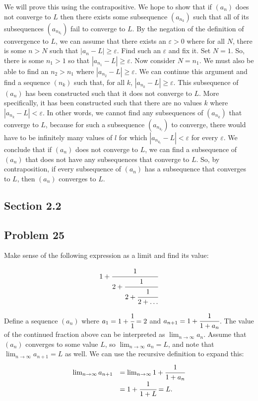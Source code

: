 \documentclass[11pt]{article}
\begin{document}
We will prove this using the contrapositive. We hope to show that if $(a_n)$ does
not converge to $L$ then there exists some subsequence $(a_{n_k})$ such that
all of its subsequences $(a_{n_{k_l}})$ fail to converge to $L$.
By the negation of the definition of convergence to $L$, we can assume that
there exists an $\varepsilon>0$ where for all $N$, there is some $n>N$ such
that $\left|a_n-L\right| \geq \varepsilon$. Find such an $\varepsilon$ and
fix it. Set $N=1$. So, there is some $n_1>1$ so that
$\left|a_{n_1}-L\right|\geq\varepsilon.$ Now consider $N=n_1$. We must also
be able to find an $n_2>n_1$ where $\left|a_{n_2}-L\right|\geq\varepsilon$.
We can continue this argument and find a sequence $(n_k)$ such that,
for all $k$, $\left|a_{n_k}-L\right|\geq\varepsilon$. This subsequence of
$(a_n)$ has been constructed such that it does not converge to $L$. More
specifically, it has been constructed such that there are no values $k$ where
$\left|a_{n_k}-L\right|<\varepsilon$. In other words, we cannot find any
subsequences of $(a_{n_k})$ that converge to $L$, because for such a
subsequence $(a_{n_{k_l}})$ to converge, there would have to be 
infinitely many values of $l$ for which
$\left|a_{n_{k_l}}-L\right|<\varepsilon$ for every $\varepsilon$.
We conclude that if $(a_n)$ does not converge to $L$, we can find a subsequence
of $(a_n)$ that does not have any subsequences that converge to $L$. So, by
contraposition, if every subsequence of $(a_n)$ has a subsequence that
converges to $L$, then $(a_n)$ converges to $L$.

\subsection*{Section 2.2}
\subsection*{Problem 25}
Make sense of the following expression as a limit and find its value:

\[ 1+\cfrac{1}{2+\cfrac{1}{2+\cfrac{1}{2+\ldots}}} \]

Define a sequence $(a_n)$ where $a_1=1+\cfrac{1}{1}=2$ and
$a_{n+1} = 1+\cfrac{1}{1+a_n}$. The value of the continued fraction above can
be interpreted as $\lim_{n\to\infty}a_n$. Assume that $(a_n)$ converges to some
value $L$, so $\lim_{n\to\infty}a_n=L$, and note that
$\lim_{n\to\infty}a_{n+1}=L$ as well. We can use the recursive definition to
expand this:
\[
\def\arraystretch{1.5}
\begin{array}{rl}
\lim_{n\to\infty}a_{n+1} &= \lim_{n\to\infty}1+\cfrac{1}{1+a_n} \\
&= 1+\cfrac{1}{1+L} = L.
\end{array}
\]
\end{document}
